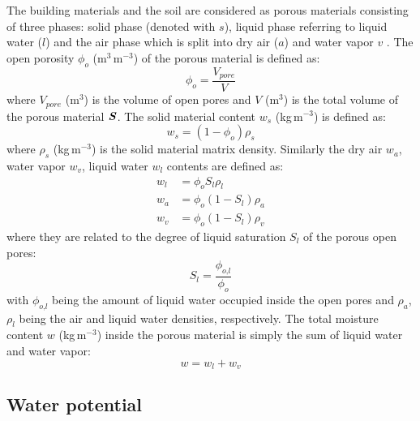The building materials and the soil are considered as porous materials consisting of three phases: solid phase (denoted with $s$), liquid phase referring to liquid water ($l$) and the air phase which is split into dry air ($a$) and water vapor $v$ \citep{Defraeye2011, Saneinejad2013, Carmeliet2005,Janssen2002}. The open porosity $\phi_o$ (m$^3$\,m$^{-3}$) of the porous material is defined as:
\begin{equation}
\phi_o = \frac{V_{\mathit{pore}}}{V}
\end{equation}
where $V_{\textit{pore}}$ (m$^3$) is the volume of open pores and $V$ (m$^3$) is the total volume of the porous material $\textbf{\textit{S}}$. The solid material content $w_s$ (kg\,m$^{-3}$) is defined as:
\begin{equation}
w_s = \left(1 - \phi_o \right) \rho_s
\end{equation}
where $\rho_s$ (kg\,m$^{-3}$) is the solid material matrix density. Similarly the dry air $w_a$, water vapor $w_v$, liquid water $w_l$ contents are defined as:
\begin{align}
w_l &= \phi_o S_l \rho_l \\
w_a &= \phi_o \left( 1 - S_l \right) \rho_a \\
w_v &= \phi_o \left( 1 - S_l \right) \rho_v
\end{align}
where they are related to the degree of liquid saturation $S_l$ of the porous open pores:
\begin{equation}
S_l = \frac{\phi_{\textit{o,l}}}{\phi_o}
\end{equation}
with $\phi_{\textit{o,l}}$ being the amount of liquid water occupied inside the open pores and $\rho_a$, $\rho_l$ being the air and liquid water densities, respectively. The total moisture content $w$ (kg\,m$^{-3}$) inside the porous material is simply the sum of liquid water and water vapor:
\begin{equation}
w = w_l + w_v
\end{equation}

\subsection{Water potential}

